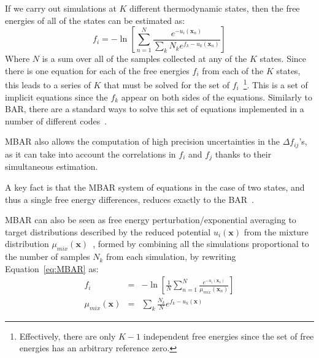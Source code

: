 \documentclass[9pt,review]{livecoms}
\newcommand{\vx}{\mathbf{x}}
\begin{document}
If we carry out simulations at $K$ different thermodynamic states,
then the free energies of all of the states can be estimated as:
\begin{equation}
f_i = -\ln \left[\sum_{n=1}^N \frac{e^{-u_i(\vx_n)}}{\sum_k N_k e^{f_k-u_k(\vx_n)}}\right]
\label{eq:MBAR}
\end{equation}
Where $N$ is a sum over all of the samples collected at any of the $K$ states.
Since there is one equation for each of the free energies $f_i$ from each of the $K$ states, this leads to a series of $K$ that must be solved for the set of $f_i$~\footnote{Effectively, there are only $K-1$ independent free energies since the set of free energies has an arbitrary reference zero.}. This is a set of implicit equations since the $f_k$ appear on both sides of the equations. Similarly to BAR, there are a standard ways to solve this set of equations implemented in a number of different codes~\cite{shirts-chodera:jcp:2008:mbar,tan_binless_2012,Zhang:JPCL:2015}.

MBAR also allows
the computation of high precision uncertainties in the $\Delta
f_{ij}$'s, as it can take into account the correlations in $f_i$ and
$f_j$ thanks to their simultaneous estimation.

A key fact is that the MBAR system of equations in the case of two states, and thus a single free energy differences, reduces exactly to the BAR~\cite{shirts-chodera:jcp:2008:mbar}.

MBAR can also be seen as free energy perturbation/exponential averaging to target distributions described by the reduced potential $u_i(\vx)$ from the mixture distribution $\mu_{mix}(\vx)$~\cite{reweighting_mixture_distribution}, formed by combining all the simulations proportional to the number of samples $N_k$ from each simulation, by rewriting Equation~\ref{eq:MBAR} as:
\begin{eqnarray}
f_i &=& -\ln \left[\frac{1}{N}\sum_{n=1}^N \frac{e^{-u_i(\vx_n)}}{\mu_{mix}(\vx_n)}\right] \nonumber\\
\mu_{mix}(\vx) &=& \sum_k \frac{N_k}{N} e^{f_k-u_k(\vx)}
\end{eqnarray}
\end{document}
